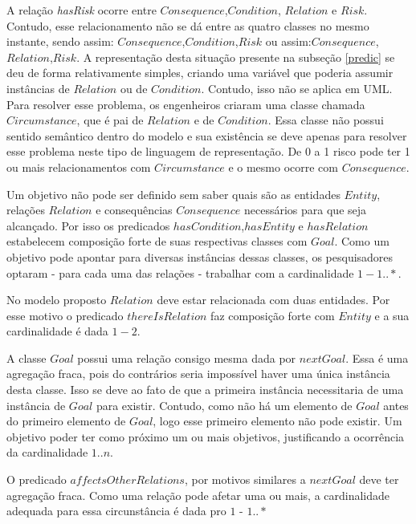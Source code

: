 A relação \textit{hasRisk} ocorre entre $Consequence$,$Condition$, $Relation$ e $Risk$. Contudo, esse relacionamento não se dá entre as quatro classes no mesmo instante, sendo assim: $Consequence$,$Condition$,$Risk$ ou assim:$Consequence$,$Relation$,$Risk$. A representação 
desta situação presente na subseção \ref{predic} se deu de forma relativamente simples, criando uma variável que poderia assumir instâncias de $Relation$ ou de $Condition$. Contudo, isso não se aplica em UML. Para resolver esse problema, os engenheiros criaram uma classe chamada $Circumstance$, que é pai de $Relation$ e de $Condition$. Essa classe não possui sentido semântico dentro do modelo e sua existência se deve apenas para resolver esse problema neste tipo de linguagem de representação. De 0 a 1 risco pode ter 1 ou mais relacionamentos com $Circumstance$ e o mesmo ocorre com $Consequence$. 

Um objetivo não pode ser definido sem saber quais são as entidades $Entity$, relações $Relation$ e consequências $Consequence$ necessários para que seja alcançado. Por isso os predicados $hasCondition$,$hasEntity$ e $hasRelation$ estabelecem composição forte de suas respectivas classes com $Goal$. Como um objetivo pode apontar para diversas instâncias dessas classes, os pesquisadores optaram - para cada uma das relações - trabalhar com a cardinalidade 
$1 - 1 .. *$.

No modelo proposto $Relation$ deve estar relacionada com duas entidades. Por esse motivo o predicado $thereIsRelation$ faz composição forte com $Entity$ e a sua cardinalidade é dada $1 - 2$. 

A classe $Goal$ possui uma relação consigo mesma dada por $nextGoal$. Essa é uma agregação fraca, pois do contrários seria impossível haver uma única instância desta classe. Isso se deve ao fato de que a primeira instância necessitaria de uma instância de $Goal$ para existir. Contudo, como não há um elemento de $Goal$ antes do primeiro elemento de $Goal$, logo esse primeiro elemento não pode existir. Um objetivo poder ter como próximo um ou mais objetivos, justificando a ocorrência da cardinalidade $1 .. n$. 

O predicado $affectsOtherRelations$, por motivos similares a $nextGoal$ deve ter agregação fraca. Como uma relação pode afetar uma ou mais, a cardinalidade adequada para essa circunstância é dada pro $1$ - $1 ..*$